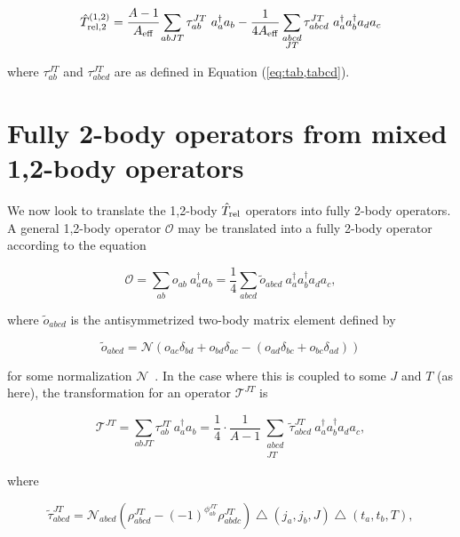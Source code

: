 \documentclass{article}
\def\aeff{A_{\rm{eff}}}
\def\trelop{\hat{T}_{\rm{rel}}}
\def\trelopi_#1^#2{\hat{T}_{\rm{rel}, #1}^{#2}}
\def\creop{a^{\dagger}}
\def\annop{a}
\begin{document}
\begin{equation}\label{eq:trel2op1,2}
  \trelopi_2^{(1,2)} = \cfrac{A-1}{\aeff}
  \displaystyle\sum_{abJT}\tau_{ab}^{JT}~\creop_a\annop_b
  -\frac{1}{4\aeff} \displaystyle\sum_{\substack{abcd\\JT}}
  \tau_{abcd}^{JT}~\creop_a\creop_b\annop_d\annop_c
\end{equation}

where $\tau_{ab}^{JT}$ and $\tau_{abcd}^{JT}$ are as defined in Equation
(\ref{eq:tab,tabcd}).


\section{Fully 2-body operators from mixed 1,2-body operators}
We now look to translate the 1,2-body $\trelop$ operators into fully 2-body
operators. A general 1,2-body operator $\mathcal{O}$ may be translated into
a fully 2-body operator according to the equation

\begin{equation*}
  \mathcal{O} = \displaystyle\sum_{ab}o_{ab}~\creop_a\annop_b =
  \frac{1}{4}\displaystyle\sum_{abcd}\tilde{o}_{abcd}
  ~\creop_a\creop_b\annop_d\annop_c,
\end{equation*}

where $\tilde{o}_{abcd}$ is the antisymmetrized two-body matrix element
defined by

\begin{equation*}
  \tilde{o}_{abcd} = \mathcal{N}\left(
  o_{ac}\delta_{bd} + o_{bd}\delta_{ac} -
  \left( o_{ad}\delta_{bc} + o_{bc}\delta_{ad} \right)
  \right)
\end{equation*}

for some normalization $\mathcal{N}$~\cite{promoting1to2}.
In the case where this is coupled to some $J$ and $T$ (as here), the
transformation for an operator $\mathcal{T}^{JT}$ is

\begin{equation}\label{eq:12to2}
  \mathcal{T}^{JT} = \displaystyle\sum_{abJT}\tau_{ab}^{JT}~\creop_a\annop_b =
  \frac{1}{4}\cdot\frac{1}{A-1}
  \displaystyle\sum_{\substack{abcd\\JT}}\tilde{\tau}_{abcd}^{JT}
  ~\creop_a\creop_b\annop_d\annop_c,
\end{equation}

where

\begin{equation}\label{eq:12to2op}
  \tilde{\tau}_{abcd}^{JT} = \mathcal{N}_{abcd} \left(
  \rho_{abcd}^{JT} - {(-1)}^{\phi_{ab}^{JT}}\rho_{abdc}^{JT}
  \right)
  \bigtriangleup\left(j_a, j_b, J\right)
  \bigtriangleup\left(t_a, t_b, T\right),
\end{equation}
\end{document}
